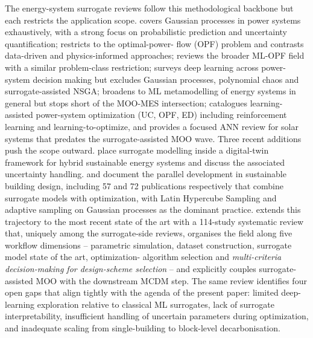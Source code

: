 The energy-system surrogate reviews follow this methodological
backbone but each restricts the application scope. \cite{Tan2026}
covers Gaussian processes in power systems exhaustively, with a
strong focus on probabilistic prediction and uncertainty
quantification; \cite{Mohammadi2024} restricts to the optimal-power-
flow (OPF) problem and contrasts data-driven and physics-informed
approaches; \cite{Khaloie2025} reviews the broader ML-OPF field
with a similar problem-class restriction; \cite{Lim2025} surveys deep
learning across power-system decision making but excludes Gaussian
processes, polynomial chaos and surrogate-assisted NSGA;
\cite{Starke2025214} broadens to ML metamodelling of energy systems
in general but stops short of the MOO-MES intersection;
\cite{Ruan2021221} catalogues learning-assisted power-system
optimization (UC, OPF, ED) including reinforcement learning and
learning-to-optimize, and \cite{Elsheikh2019622} provides a focused
ANN review for solar systems that predates the surrogate-assisted
MOO wave. Three recent additions push the scope outward.
\cite{Khan2024_DT} place surrogate modelling inside a digital-twin
framework for hybrid sustainable energy systems and discuss the
associated uncertainty handling. \cite{Westermann2019} and
\cite{Elwy2024} document the parallel development in sustainable
building design, including 57 and 72 publications respectively that
combine surrogate models with optimization, with Latin Hypercube
Sampling and adaptive sampling on Gaussian processes as the
dominant practice. \cite{Zhang2026_building} extends this trajectory
to the most recent state of the art with a 114-study systematic
review that, uniquely among the surrogate-side reviews, organises the
field along five workflow dimensions -- parametric simulation,
dataset construction, surrogate model state of the art, optimization-
algorithm selection and \emph{multi-criteria decision-making for
design-scheme selection} -- and explicitly couples surrogate-assisted
MOO with the downstream MCDM step. The same review identifies four
open gaps that align tightly with the agenda of the present paper:
limited deep-learning exploration relative to classical ML
surrogates, lack of surrogate interpretability, insufficient handling
of uncertain parameters during optimization, and inadequate scaling
from single-building to block-level decarbonisation.

